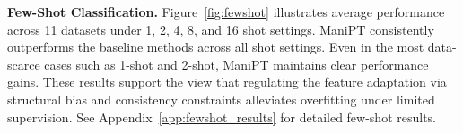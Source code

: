 \documentclass{article}
\theoremstyle{plain}
\theoremstyle{definition}
\theoremstyle{remark}
\begin{document}
	\textbf{Few-Shot Classification.} Figure~\ref{fig:fewshot} illustrates average performance across 11 datasets under 1, 2, 4, 8, and 16 shot settings. ManiPT consistently outperforms the baseline methods across all shot settings. Even in the most data-scarce cases such as 1-shot and 2-shot, ManiPT maintains clear performance gains. These results support the view that regulating the feature adaptation via structural bias and consistency constraints alleviates overfitting under limited supervision. See Appendix~\ref{app:fewshot_results} for detailed few-shot results.
	\vspace{-15pt}
	\begin{table}[t!]
		\caption{Ablation study of ManiPT components. We report performance for the baseline, variants with a single component removed, and the full ManiPT model. Each component brings improvements over the baseline, and combining cosine consistency, structural bias, and LLM-based enrichment yields the best overall trade-off.}
		\label{tab:ablation}
		\centering
		\vspace{-10pt}
	\end{table}
	
\end{document}
